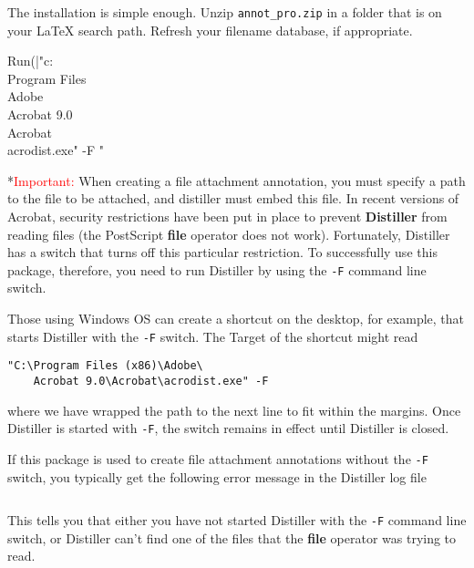 \documentclass[12pt]{article}
\makeatletter
\let\app\textsf
\let\uif\textsf
\renewcommand*{\theparagraph}{\texorpdfstring{\protect\P\protect\ }{\textparagraph}}
\renewcommand{\paragraph}
    {\renewcommand{\@seccntformat}[1]{\theparagraph}%
    \@startsection{paragraph}{4}{0pt}{6pt}{-3pt}{\color{\aeb@subsubsectioncolor}\bfseries}}
\makeatother
\begin{document}
The installation is simple enough. Unzip \texttt{annot\_pro.zip} in a
folder that is on your {\LaTeX} search path.  Refresh your filename
database, if appropriate.

\begin{defineJS}{\winedtDist}
Run(|"c:\\Program Files\\Adobe\\Acrobat 9.0\\Acrobat\\acrodist.exe" -F "%
\end{defineJS}

\paragraph*{\textcolor{red}{Important:}} When creating a file attachment annotation,
you must specify a path to the file to be attached, and distiller must embed
this file.  In recent versions of Acrobat,
security restrictions have been put in place to prevent
\textbf{Distiller} from reading files (the PostScript \textbf{file}
operator does not work). Fortunately, Distiller has a switch that
turns off this particular restriction. To successfully use this
package, therefore, you need to run Distiller by using the
\texttt{-F} command line switch.


Those using \app{Windows OS} can create a shortcut on the desktop, for example,
that starts \app{Distiller} with the \texttt{-F} switch. The \uif{Target} of the shortcut might read
\begin{Verbatim}[xleftmargin=\leftmargini,fontsize=\small]
"C:\Program Files (x86)\Adobe\
    Acrobat 9.0\Acrobat\acrodist.exe" -F
\end{Verbatim}
where we have wrapped the path to the next line to fit within the margins.
Once \app{Distiller} is started with \texttt{-F}, the switch remains in effect
until \app{Distiller} is closed.

If this package is used to create file attachment annotations without the
\texttt{-F} switch, you typically get the following error message in
the Distiller log file
\begin{Verbatim}[xleftmargin=\leftmargini,fontsize=\small]
%%[ Error: undefinedfilename; OffendingCommand: file ]%%
\end{Verbatim}
This tells you that either you have not started Distiller with the
\texttt{-F} command line switch, or Distiller can't find one of the
files that the \textbf{file} operator was trying to read.
\end{document}
